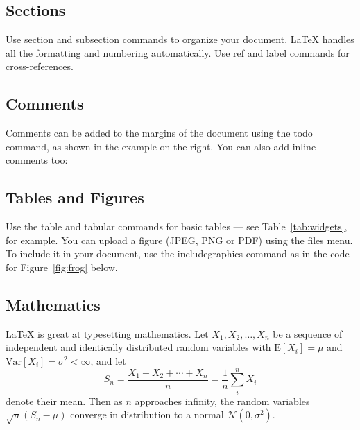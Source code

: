 \documentclass[12pt]{article}
\begin{document}
\subsection{Sections}

Use section and subsection commands to organize your document. \LaTeX{} handles all the formatting and numbering automatically. Use ref and label commands for cross-references.

\subsection{Comments}

Comments can be added to the margins of the document using the  todo command, as shown in the example on the right. You can also add inline comments too:


\subsection{Tables and Figures}

Use the table and tabular commands for basic tables --- see Table~\ref{tab:widgets}, for example. You can upload a figure (JPEG, PNG or PDF) using the files menu. To include it in your document, use the includegraphics command as in the code for Figure~\ref{fig:frog} below.



\subsection{Mathematics}

\LaTeX{} is great at typesetting mathematics. Let $X_1, X_2, \ldots, X_n$ be a sequence of independent and identically distributed random variables with $\text{E}[X_i] = \mu$ and $\text{Var}[X_i] = \sigma^2 < \infty$, and let
$$S_n = \frac{X_1 + X_2 + \cdots + X_n}{n}
      = \frac{1}{n}\sum_{i}^{n} X_i$$
denote their mean. Then as $n$ approaches infinity, the random variables $\sqrt{n}(S_n - \mu)$ converge in distribution to a normal $\mathcal{N}(0, \sigma^2)$.
\end{document}
